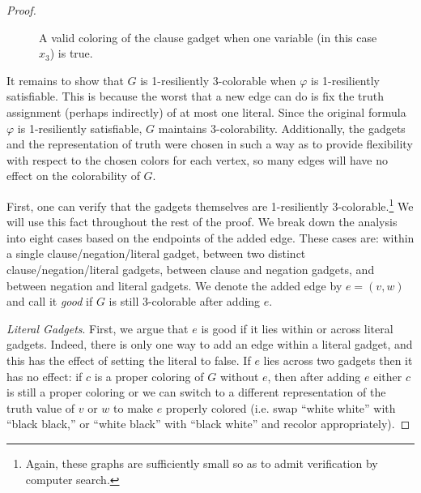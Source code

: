 \documentclass{article}[11pt]  %
\begin{document}
\begin{proof}
\begin{figure}
\centering
{}
\caption{A valid coloring of the clause gadget when one variable (in this case $x_3$) is true.}
\label{fig:clause-gadget-proof}
\end{figure}

It remains to show that $G$ is 1-resiliently 3-colorable when $\varphi$ is
1-resiliently satisfiable. This is because the worst that a new edge can do is
fix the truth assignment (perhaps indirectly) of at most one literal. Since the
original formula $\varphi$ is 1-resiliently satisfiable, $G$ maintains
3-colorability.  Additionally, the gadgets and the representation of truth were
chosen in such a way as to provide flexibility with respect to the chosen colors
for each vertex, so many edges will have no effect on the colorability of $G$. 

First, one can verify that the gadgets themselves are 1-resiliently
3-colorable.\footnote{Again, these graphs are sufficiently small so as to admit
verification by computer search.} We will use this fact throughout the rest of
the proof. We break down the analysis into eight cases based on the endpoints of
the added edge. These cases are: within a single clause/negation/literal gadget,
between two distinct clause/negation/literal gadgets, between clause and
negation gadgets, and between negation and literal gadgets. We denote the added
edge by $e = (v,w)$ and call it \emph{good} if $G$ is still 3-colorable after
adding $e$. 

\emph{Literal Gadgets}. First, we argue that $e$ is good if it lies within or
across literal gadgets. Indeed, there is only one way to add an edge within a
literal gadget, and this has the effect of setting the literal to false. If $e$
lies across two gadgets then it has no effect: if $c$ is a proper coloring of
$G$ without $e$, then after adding $e$ either $c$ is still a proper coloring or
we can switch to a different representation of the truth value of $v$ or $w$ to
make $e$ properly colored (i.e. swap ``white white'' with ``black black,'' or
``white black'' with ``black white'' and recolor appropriately). 


\end{proof}
\end{document}
